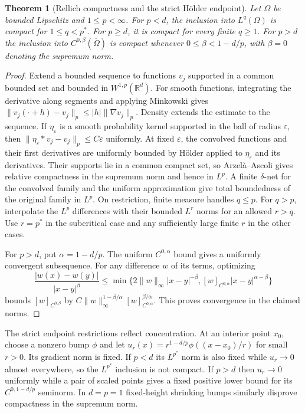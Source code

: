 \documentclass[11pt,oneside,openany]{book}
\newtheorem{theorem}{Theorem}[chapter]
\theoremstyle{definition}
\theoremstyle{remark}
\begin{document}
\begin{theorem}[Rellich compactness and the strict H\"older endpoint]
\label{p102:AN-11-C05-R02}
Let \(\Omega\) be bounded Lipschitz and \(1\le p<\infty\).
For \(p<d\), the inclusion into \(L^q(\Omega)\) is compact for
\(1\le q<p^*\). For \(p\ge d\), it is compact for every finite
\(q\ge1\). For \(p>d\) the inclusion into
\(C^{0,\beta}(\overline\Omega)\) is compact whenever
\(0\le\beta<1-d/p\), with \(\beta=0\) denoting the supremum norm.
\end{theorem}
\begin{proof}
Extend a bounded sequence to functions \(v_j\) supported in a common
bounded set and bounded in \(W^{1,p}(\mathbb R^d)\). For smooth
functions, integrating the derivative along segments and applying
Minkowski gives
\(\|v_j(\cdot+h)-v_j\|_p\le |h|\|\nabla v_j\|_p\).
Density extends the estimate to the sequence. If \(\eta_\varepsilon\)
is a smooth probability kernel supported in the ball of radius
\(\varepsilon\), then
\(\|\eta_\varepsilon*v_j-v_j\|_p\le C\varepsilon\) uniformly.
At fixed \(\varepsilon\), the convolved functions and their first
derivatives are uniformly bounded by H\"older applied to
\(\eta_\varepsilon\) and its derivatives. Their supports lie in a common
compact set, so Arzel\`a--Ascoli gives relative compactness in
the supremum norm and hence in \(L^p\). A finite \(\delta\)-net
for the convolved family and the uniform approximation give total
boundedness of the original family in \(L^p\).
On restriction, finite measure handles \(q\le p\). For \(q>p\),
interpolate the \(L^p\) differences with their bounded \(L^r\) norms
for an allowed \(r>q\). Use \(r=p^*\) in the subcritical case
and any sufficiently large finite \(r\) in the other cases.

For \(p>d\), put \(\alpha=1-d/p\). The uniform \(C^{0,\alpha}\)
bound gives a uniformly convergent subsequence. For any difference \(w\)
of its terms, optimizing
\[
 \frac{|w(x)-w(y)|}{|x-y|^\beta}
 \le \min\{2\|w\|_\infty |x-y|^{-\beta},
                     [w]_{C^{0,\alpha}}|x-y|^{\alpha-\beta}\}
\]
bounds \([w]_{C^{0,\beta}}\) by
\(C\|w\|_\infty^{1-\beta/\alpha}[w]_{C^{0,\alpha}}^{\beta/\alpha}\).
This proves convergence in the claimed norms.
\end{proof}

The strict endpoint restrictions reflect concentration. At an interior
point \(x_0\), choose a nonzero bump \(\phi\) and let
\(u_r(x)=r^{1-d/p}\phi((x-x_0)/r)\) for small \(r>0\).
Its gradient norm is fixed. If \(p<d\) its \(L^{p^*}\) norm is
also fixed while \(u_r\to0\) almost everywhere, so the \(L^{p^*}\)
inclusion is not compact. If \(p>d\) then \(u_r\to0\) uniformly
while a pair of scaled points gives a fixed positive lower bound
for its \(C^{0,1-d/p}\) seminorm. In \(d=p=1\) fixed-height shrinking
bumps similarly disprove compactness in the supremum norm.
\end{document}
